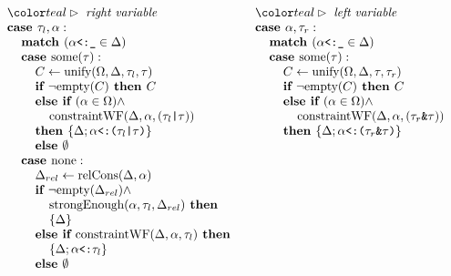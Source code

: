 \documentclass[acmsmall]{acmart}
\begin{document}
\begin{figure*}[h]
\[\begin{array}[t]{@{} l}
    \I \C{right variable}
    \\
    \I \B{case } \tau_l, \alpha : 
    \\
    \I\I \B{match } (\code{$\alpha$<:\_} \in \Delta)
    \\
    \I\I \B{case } \F{some}(\tau) :
    \\
    \I\I\I C \leftarrow \F{unify}(\Omega, \Delta, \tau_l, \tau)
    \\
    \I\I\I \B{if } \neg \F{empty}(C) \B{ then } C
    \\
    \I\I\I \B{else if } (\alpha \in \Omega) \wedge 
    \\
    \I\I\I\I \F{constraintWF}(\Delta, \alpha, (\code{$\tau_l$|$\tau$})) 
    \\
    \I\I\I \B{then } \{\Delta;\code{$\alpha$<:($\tau_l$|$\tau$)}\}
    \\
    \I\I\I \B{else } \emptyset 
    \\
    \I\I \B{case } \F{none} :
    \\
    \I\I\I \Delta_{rel} \leftarrow \F{relCons}(\Delta, \alpha)  
    \\
    \I\I\I \B{if } \neg \F{empty}(\Delta_{rel}) \wedge 
    \\
    \I\I\I\I \F{strongEnough}(\alpha, \tau_l, \Delta_{rel}) \B{ then }
    \\
    \I\I\I\I \{\Delta\}
    \\
    \I\I\I \B{else if } \F{constraintWF}(\Delta, \alpha, \tau_l) \B{ then }
    \\
    \I\I\I\I \{\Delta;\code{$\alpha$<:$\tau_l$}\}
    \\
    \I\I\I \B{else } \emptyset 
\end{array}
\begin{array}[t]{@{} l}
  \I \C{left variable}
  \\
  \I \B{case } \alpha, \tau_r : 
  \\
  \I\I \B{match } (\code{$\alpha$<:\_} \in \Delta)
  \\
  \I\I \B{case } \F{some}(\tau) :
  \\
  \I\I\I C \leftarrow \F{unify}(\Omega, \Delta, \tau, \tau_r)
  \\
  \I\I\I \B{if } \neg \F{empty}(C) \B{ then } C
  \\
  \I\I\I \B{else if } (\alpha \in \Omega) \wedge 
  \\
  \I\I\I\I \F{constraintWF}(\Delta, \alpha, (\code{$\tau_r$\&$\tau$})) 
  \\
  \I\I\I \B{then } \{\Delta;\code{$\alpha$<:($\tau_r$\&$\tau$)}\}

\end{array}\]
\end{figure*}
\end{document}
